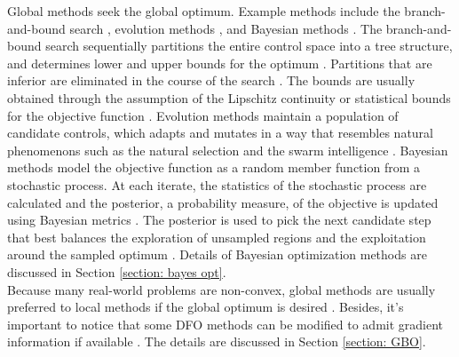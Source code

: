 Global methods seek the global optimum. 
Example methods include the branch-and-bound search \cite{Branch and Bound}, evolution methods \cite{evolution review}, and 
Bayesian methods \cite{practical Bayesian, Locatelli, prob of improve}. 
The branch-and-bound search sequentially partitions the entire control space into a tree structure, and
determines lower and upper bounds for the optimum
\cite{Branch and Bound}. Partitions that are inferior are eliminated 
in the course of the search \cite{Branch and Bound}. The bounds are usually obtained through the assumption of the
Lipschitz continuity or statistical bounds for the objective function \cite{Branch and Bound}. 
Evolution methods maintain a population
of candidate controls, which adapts and mutates in a way that resembles natural phenomenons
such as the natural selection \cite{genetic algo, cuckoo} 
and the swarm intelligence \cite{particle swarm}.
Bayesian methods model the objective function as a random member function from a stochastic process.
At each iterate, the statistics of the stochastic process are calculated 
and the posterior, a probability measure, of the objective 
is updated using Bayesian metrics \cite{practical Bayesian, review EI}. 
The posterior is used to pick the next candidate step
that best balances the exploration of unsampled regions and the exploitation around the sampled
optimum \cite{Locatelli, jones1998, GP bandit}. Details of Bayesian optimization methods are discussed in Section \ref{section: bayes opt}.\\

Because many real-world problems are non-convex, global methods are usually preferred to local methods
if the global optimum is desired \cite{gradfreereview}. Besides, it's important to notice that some DFO methods 
can be modified to admit gradient information if available \cite{derivative RKHS, grad coKriging, grad particle swarm, grad cuckoo}. 
The details are discussed in Section
\ref{section: GBO}.\\

